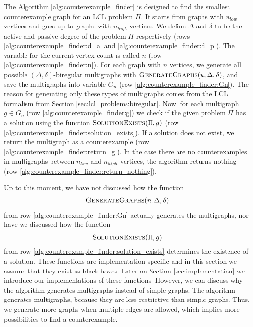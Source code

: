 The Algorithm \ref{alg:counterexample_finder} is designed to find the smallest counterexample graph for an LCL problem $\Pi$.
It starts from graphs with $n_{low}$ vertices and goes up to graphs with $n_{high}$ vertices.
We define $\Delta$ and $\delta$ to be the active and passive degree of the problem $\Pi$ respectively (rows \ref{alg:counterexample_finder:d_a} and \ref{alg:counterexample_finder:d_p}).
The variable for the current vertex count is called $n$ (row \ref{alg:counterexample_finder:n}).
For each graph with $n$ vertices, we generate all possible $(\Delta, \delta)$-biregular multigraphs with $\textsc{GenerateGraphs}(n, \Delta, \delta)$, and save the multigraphs into variable $G_n$ (row \ref{alg:counterexample_finder:Gn}).
The reason for generating only these types of multigraphs comes from the LCL formalism from Section \ref{sec:lcl_problems:biregular}.
Now, for each multigraph $g \in G_n$ (row \ref{alg:counterexample_finder:g}) we check if the given problem $\Pi$ has a solution using the function $\textsc{SolutionExists}(\Pi, g)$ (row \ref{alg:counterexample_finder:solution_exists}).
If a solution does not exist, we return the multigraph as a counterexample (row \ref{alg:counterexample_finder:return_g}).
In the case there are no counterexamples in multigraphs between $n_{low}$ and $n_{high}$ vertices, the algorithm returns nothing (row \ref{alg:counterexample_finder:return_nothing}).

Up to this moment, we have not discussed how the function \[ \textsc{GenerateGraphs}(n, \Delta, \delta) \] from row \ref{alg:counterexample_finder:Gn} actually generates the multigraphs, nor have we discussed how the function \[ \textsc{SolutionExists}(\Pi, g) \] from row \ref{alg:counterexample_finder:solution_exists} determines the existence of a solution.
These functions are implementation specific and in this section we assume that they exist as black boxes.
Later on Section \ref{sec:implementation} we introduce our implementations of these functions.
However, we can discuss why the algorithm generates multigraphs instead of simple graphs.
The algorithm generates multigraphs, because they are less restrictive than simple graphs.
Thus, we generate more graphs when multiple edges are allowed, which implies more possibilities to find a counterexample.

